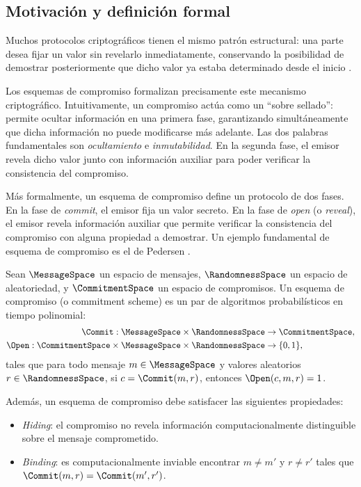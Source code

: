 
\subsection{Motivación y definición formal}

Muchos protocolos criptográficos tienen el mismo patrón estructural: una parte desea fijar un valor sin revelarlo inmediatamente, conservando la posibilidad de demostrar posteriormente que dicho valor ya estaba determinado desde el inicio \cite{hac,katz}.

Los esquemas de compromiso formalizan precisamente este mecanismo criptográfico. Intuitivamente, un compromiso actúa como un “sobre sellado”: permite ocultar información en una primera fase, garantizando simultáneamente que dicha información no puede modificarse más adelante. Las dos palabras fundamentales son \emph{ocultamiento} e \emph{inmutabilidad}. En la segunda fase, el emisor revela dicho valor junto con información auxiliar para poder verificar la consistencia del compromiso.

Más formalmente, un esquema de compromiso define un protocolo de dos fases. En la fase de \textit{commit}, el emisor fija un valor secreto. En la fase de \textit{open} (o \textit{reveal}), el emisor revela información auxiliar que permite verificar la consistencia del compromiso con alguna propiedad a demostrar. Un ejemplo fundamental de esquema de compromiso es el de Pedersen \cite{Pedersen}.

\begin{definition}
	Sean $\MessageSpace$ un espacio de mensajes, $\RandomnessSpace$ un espacio de aleatoriedad, y $\CommitmentSpace$ un espacio de compromisos. Un esquema de compromiso (o commitment scheme) es un par de algoritmos probabilísticos en tiempo polinomial:
	$$\begin{aligned}
		\Commit: \MessageSpace \times \RandomnessSpace &\to \CommitmentSpace, \\
		\Open: \CommitmentSpace \times \MessageSpace \times \RandomnessSpace &\to \{0,1\},
	\end{aligned}$$
	tales que para todo mensaje $m \in \MessageSpace$ y valores aleatorios $r \in \RandomnessSpace$, si $c = \Commit(m,r)$, entonces $\Open(c,m,r) = 1$.
	
	Además, un esquema de compromiso debe satisfacer las siguientes propiedades:
	\begin{itemize}[noitemsep]
			\item \textit{Hiding}: el compromiso no revela información computacionalmente distinguible sobre el mensaje comprometido.
			\item \textit{Binding}: es computacionalmente inviable encontrar $m \neq m'$ y $r \neq r'$ tales que $\Commit(m,r) = \Commit(m',r')$.
	\end{itemize}
\end{definition}

